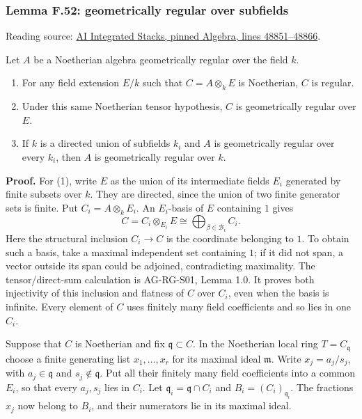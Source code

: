 \documentclass[11pt,a4paper,openany]{report}
\providecommand{\tightlist}{\setlength{\itemsep}{0pt}\setlength{\parskip}{0pt}}
\begin{document}
\subsubsection{Lemma F.52: geometrically regular over subfields}\label{AG-RG-S05-lemma-f.52-geometrically-regular-over-subfields}

Reading source: \href{https://github.com/KokunoYumeto/unofficial-stacks-project-ai-drafts/blob/565b10e987aba5969b21145a0833f42d69f96790/algebra.tex\#L48851-L48866}{AI Integrated Stacks, pinned Algebra, lines 48851--48866}.

Let \(A\) be a Noetherian algebra geometrically regular over the field \(k\).

\begin{enumerate}
\def\labelenumi{\arabic{enumi}.}
\tightlist
\item
  For any field extension \(E/k\) such that \(C=A\otimes_kE\) is Noetherian, \(C\) is regular.
\item
  Under this same Noetherian tensor hypothesis, \(C\) is geometrically regular over \(E\).
\item
  If \(k\) is a directed union of subfields \(k_i\) and \(A\) is geometrically regular over every \(k_i\), then \(A\) is geometrically regular over \(k\).
\end{enumerate}

\textbf{Proof.} For (1), write \(E\) as the union of its intermediate fields \(E_i\) generated by finite subsets over \(k\). They are directed, since the union of two finite generator sets is finite. Put \(C_i=A\otimes_kE_i\). An \(E_i\)-basis of \(E\) containing \(1\) gives \[C=C_i\otimes_{E_i}E\cong\bigoplus_{\beta\in\mathcal B_i}C_i.\] Here the structural inclusion \(C_i\to C\) is the coordinate belonging to \(1\). To obtain such a basis, take a maximal independent set containing \(1\); if it did not span, a vector outside its span could be adjoined, contradicting maximality. The tensor/direct-sum calculation is AG-RG-S01, Lemma 1.0. It proves both injectivity of this inclusion and flatness of \(C\) over \(C_i\), even when the basis is infinite. Every element of \(C\) uses finitely many field coefficients and so lies in one \(C_i\).

Suppose that \(C\) is Noetherian and fix \(\mathfrak q\subset C\). In the Noetherian local ring \(T=C_{\mathfrak q}\) choose a finite generating list \(x_1,\ldots,x_r\) for its maximal ideal \(\mathfrak m\). Write \(x_j=a_j/s_j\), with \(a_j\in\mathfrak q\) and \(s_j\notin\mathfrak q\). Put all their finitely many field coefficients into a common \(E_i\), so that every \(a_j,s_j\) lies in \(C_i\). Let \(\mathfrak q_i=\mathfrak q\cap C_i\) and \(B_i=(C_i)_{\mathfrak q_i}\). The fractions \(x_j\) now belong to \(B_i\), and their numerators lie in its maximal ideal.
\end{document}
